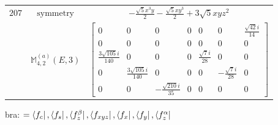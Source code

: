 \documentclass[fleqn,8pt,landscape]{jsarticle}
\begin{document}
\begin{longtable}{ccc}
$ 207 $ & $ \text{symmetry} $ & $ - \frac{\sqrt{5} x^{3} y}{2} - \frac{\sqrt{5} x y^{3}}{2} + 3 \sqrt{5} x y z^{2} $ \\
$  $ & $ \mathbb{M}_{4,2}^{(a)}(E,3) $ & $ \begin{bmatrix} 0 & 0 & 0 & 0 & 0 & 0 & \frac{\sqrt{42} i}{14} \\ 0 & 0 & 0 & 0 & 0 & 0 & 0 \\ \frac{3 \sqrt{105} i}{140} & 0 & 0 & 0 & \frac{\sqrt{7} i}{28} & 0 & 0 \\ 0 & \frac{3 \sqrt{105} i}{140} & 0 & 0 & 0 & - \frac{\sqrt{7} i}{28} & 0 \\ 0 & 0 & - \frac{\sqrt{210} i}{35} & 0 & 0 & 0 & 0 \end{bmatrix} $ \\ \hline
\end{longtable}
bra: $=\bra{f_{c}}, \bra{f_{s}}, \bra{f_{z}^{\beta}}, \bra{f_{xyz}}, \bra{f_{x}}, \bra{f_{y}}, \bra{f_{z}^{\alpha}}$
\end{document}
